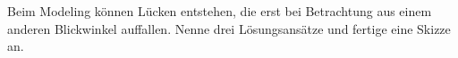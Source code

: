 \documentclass[../../main.tex]{subfiles}
\begin{document}
Beim Modeling können Lücken entstehen, die erst bei Betrachtung aus einem anderen Blickwinkel auffallen.
Nenne drei Lösungsansätze und fertige eine Skizze an.
\end{document}
